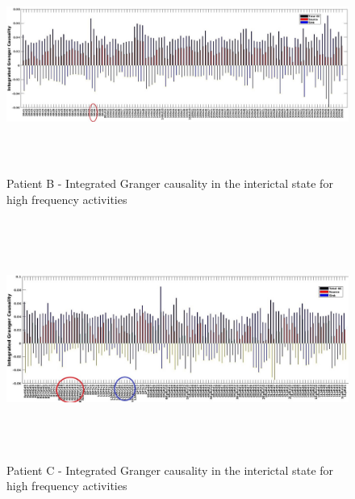 \begin{figure}
\centerline{
	\includegraphics[height =2.8in]{Plots/Patient_B_interictal_high.jpg}
	}

	\caption{Patient B - Integrated Granger causality in the interictal state for high frequency activities}

	\label{fig:apdx_patient_b_interictal_high}
\end{figure}

\begin{figure}
\centerline{
	\includegraphics[height =3.1in]{Plots/Patient_C_interictal_high.jpg}
	}

	\caption{Patient C - Integrated Granger causality in the interictal state for high frequency activities}

	\label{fig:apdx_patient_c_interictal_high}
\end{figure}




